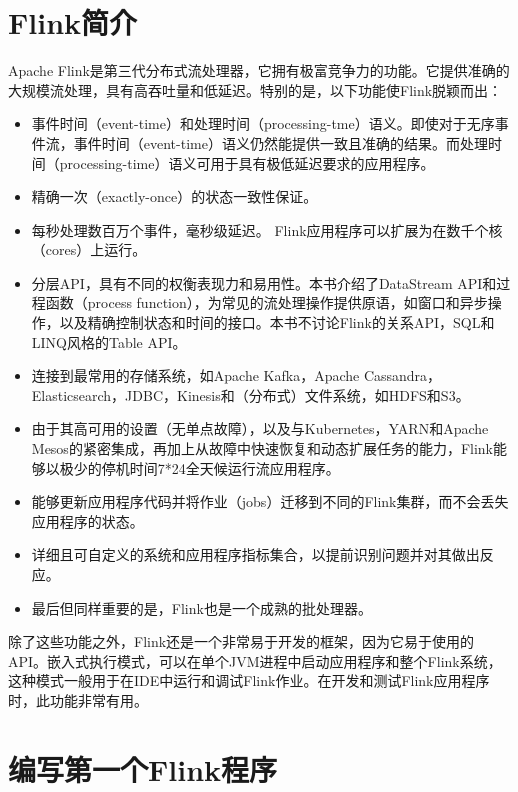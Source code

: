 \documentclass[cn,11pt,chinese]{elegantbook}
\providecommand{\tightlist}{%
  \setlength{\itemsep}{0pt}\setlength{\parskip}{0pt}}
\begin{document}
\hypertarget{flinkux7b80ux4ecb}{%
\section{Flink简介}\label{flinkux7b80ux4ecb}}

Apache
Flink是第三代分布式流处理器，它拥有极富竞争力的功能。它提供准确的大规模流处理，具有高吞吐量和低延迟。特别的是，以下功能使Flink脱颖而出：

\begin{itemize}
\tightlist
\item
  事件时间（event-time）和处理时间（processing-tme）语义。即使对于无序事件流，事件时间（event-time）语义仍然能提供一致且准确的结果。而处理时间（processing-time）语义可用于具有极低延迟要求的应用程序。
\item
  精确一次（exactly-once）的状态一致性保证。
\item
  每秒处理数百万个事件，毫秒级延迟。
  Flink应用程序可以扩展为在数千个核（cores）上运行。
\item
  分层API，具有不同的权衡表现力和易用性。本书介绍了DataStream
  API和过程函数（process
  function），为常见的流处理操作提供原语，如窗口和异步操作，以及精确控制状态和时间的接口。本书不讨论Flink的关系API，SQL和LINQ风格的Table
  API。
\item
  连接到最常用的存储系统，如Apache Kafka，Apache
  Cassandra，Elasticsearch，JDBC，Kinesis和（分布式）文件系统，如HDFS和S3。
\item
  由于其高可用的设置（无单点故障），以及与Kubernetes，YARN和Apache
  Mesos的紧密集成，再加上从故障中快速恢复和动态扩展任务的能力，Flink能够以极少的停机时间7*24全天候运行流应用程序。
\item
  能够更新应用程序代码并将作业（jobs）迁移到不同的Flink集群，而不会丢失应用程序的状态。
\item
  详细且可自定义的系统和应用程序指标集合，以提前识别问题并对其做出反应。
\item
  最后但同样重要的是，Flink也是一个成熟的批处理器。
\end{itemize}

除了这些功能之外，Flink还是一个非常易于开发的框架，因为它易于使用的API。嵌入式执行模式，可以在单个JVM进程中启动应用程序和整个Flink系统，这种模式一般用于在IDE中运行和调试Flink作业。在开发和测试Flink应用程序时，此功能非常有用。

\hypertarget{ux7f16ux5199ux7b2cux4e00ux4e2aflinkux7a0bux5e8f}{%
\section{编写第一个Flink程序}\label{ux7f16ux5199ux7b2cux4e00ux4e2aflinkux7a0bux5e8f}}
\end{document}

